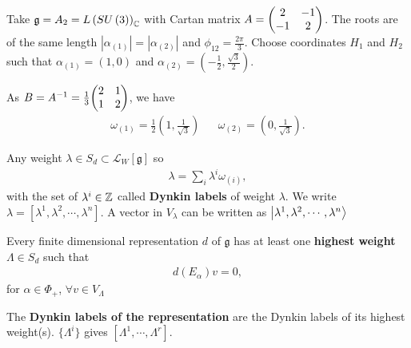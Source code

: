 \begin{example}
    Take $\mathfrak{g} = A_2 = L \left( SU \left( 3 \right)  \right)_{\mathbb{C}}$ with Cartan matrix $A = \mqty( 2 & -1 \\ -1 & 2 )$. The roots are of the same length $\left| \alpha_{\left( 1 \right) } \right| = \left| \alpha_{\left( 2 \right) } \right| $ and $\phi_{12} = \frac{2\pi}{3}$. Choose coordinates $H_1$ and $H_2$ such that $\alpha_{\left( 1 \right) } = \left( 1,0 \right) $ and $\alpha_{\left( 2 \right) } = \left( -\frac{1}{2}, \frac{\sqrt{3}}{2}  \right) $.

    As $B = A^{-1} = \frac{1}{3} \mqty( 2 & 1 \\ 1 & 2)$, we have
    \begin{align}
        \omega_{\left( 1 \right) } = \frac{1}{2} \left( 1, \frac{1}{\sqrt{3} } \right)  && \omega_{\left( 2 \right) } = \left( 0, \frac{1}{\sqrt{3} } \right) 
    .\end{align}
\end{example}


\begin{definition}
    Any weight $\lambda \in S_d \subset\mathcal{L}_W \left[ \mathfrak{g} \right] $ so
    \begin{align}
        \lambda = \sum_{i}^{} \lambda^{i} \omega_{\left( i \right) }
    ,\end{align}
    with the set of $\lambda^{i} \in \mathbb{Z}$ called \textbf{Dynkin labels} of weight $\lambda$. We write $\lambda = \left[ \lambda^{1}, \lambda^{2}, \cdots, \lambda^{n} \right] $. A vector in $V_\lambda$ can be written as $\ket{\lambda^{1}, \lambda^{2}, \cdots, \lambda^{n}}$
\end{definition}

\begin{definition}
    Every finite dimensional representation $d$ of $\mathfrak{g}$ has at least one \textbf{highest weight} $\Lambda \in S_d$ such that
    \begin{align}
        d\left( E_\alpha \right) v = 0
    ,\end{align}
    for $\alpha \in \Phi_+$, $\forall v \in V_\Lambda$
\end{definition}

\begin{definition}
    The \textbf{Dynkin labels of the representation} are the Dynkin labels of its highest weight(s). $\{\Lambda^{i}\} $ gives $\left[ \Lambda^{1}, \cdots, \Lambda^{r} \right] $.
\end{definition}

